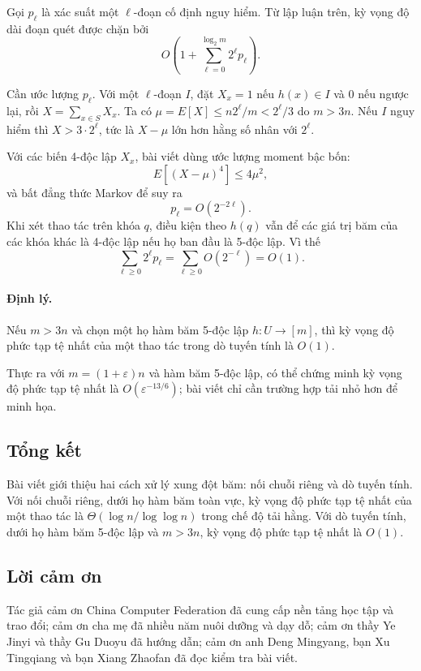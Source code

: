 \documentclass[11pt]{article}
\begin{document}
Gọi $p_\ell$ là xác suất một $\ell$-đoạn cố định nguy hiểm. Từ lập luận trên,
kỳ vọng độ dài đoạn quét được chặn bởi
\[
  O\!\left(1+\sum_{\ell=0}^{\log_2 m} 2^\ell p_\ell\right).
\]

Cần ước lượng $p_\ell$. Với một $\ell$-đoạn $I$, đặt $X_x=1$ nếu
$h(x)\in I$ và $0$ nếu ngược lại, rồi $X=\sum_{x\in S}X_x$. Ta có
$\mu=E[X]\le n2^\ell/m < 2^\ell/3$ do $m>3n$. Nếu $I$ nguy hiểm thì
$X>3\cdot2^\ell$, tức là $X-\mu$ lớn hơn hằng số nhân với $2^\ell$.

Với các biến 4-độc lập $X_x$, bài viết dùng ước lượng moment bậc bốn:
\[
  E[(X-\mu)^4]\le 4\mu^2,
\]
và bất đẳng thức Markov để suy ra
\[
  p_\ell = O(2^{-2\ell}).
\]
Khi xét thao tác trên khóa $q$, điều kiện theo $h(q)$ vẫn để các giá trị băm của
các khóa khác là 4-độc lập nếu họ ban đầu là 5-độc lập. Vì thế
\[
  \sum_{\ell\ge 0} 2^\ell p_\ell
  = \sum_{\ell\ge 0} O(2^{-\ell})
  = O(1).
\]

\paragraph{Định lý.}
Nếu $m>3n$ và chọn một họ hàm băm 5-độc lập $h:U\to[m]$, thì kỳ vọng độ phức
tạp tệ nhất của một thao tác trong dò tuyến tính là $O(1)$.

Thực ra với $m=(1+\varepsilon)n$ và hàm băm 5-độc lập, có thể chứng minh kỳ vọng
độ phức tạp tệ nhất là $O(\varepsilon^{-13/6})$; bài viết chỉ cần trường hợp
tải nhỏ hơn để minh họa.

\subsection{Tổng kết}

Bài viết giới thiệu hai cách xử lý xung đột băm: nối chuỗi riêng và dò tuyến
tính. Với nối chuỗi riêng, dưới họ hàm băm toàn vực, kỳ vọng độ phức tạp tệ nhất
của một thao tác là $\Theta(\log n/\log\log n)$ trong chế độ tải hằng. Với dò
tuyến tính, dưới họ hàm băm 5-độc lập và $m>3n$, kỳ vọng độ phức tạp tệ nhất là
$O(1)$.

\subsection*{Lời cảm ơn}

Tác giả cảm ơn China Computer Federation đã cung cấp nền tảng học tập và trao
đổi; cảm ơn cha mẹ đã nhiều năm nuôi dưỡng và dạy dỗ; cảm ơn thầy Ye Jinyi và
thầy Gu Duoyu đã hướng dẫn; cảm ơn anh Deng Mingyang, bạn Xu Tingqiang và bạn
Xiang Zhaofan đã đọc kiểm tra bài viết.
\end{document}
